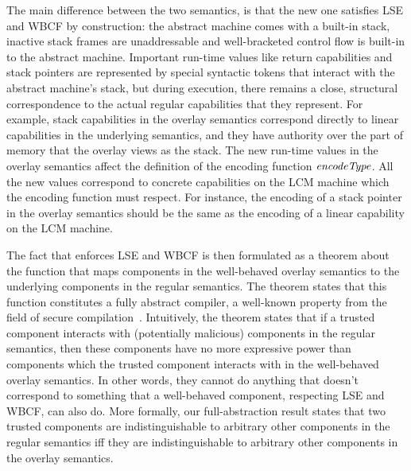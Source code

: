 \documentclass[acmsmall,screen]{acmart}\settopmatter{}
\newcommand{\trgcm}{\textsc{LCM}}
\newenvironment{jversion}%
    {\color{OliveGreen}}{}
\begin{document}
The main difference between the two semantics, is that the new one satisfies LSE and WBCF by construction: the abstract machine comes with a built-in stack, inactive stack frames are unaddressable and well-bracketed control flow is built-in to the abstract machine.
Important run-time values like return capabilities and stack pointers are represented by special syntactic tokens that interact with the abstract machine's stack, but during execution, there remains a close, structural correspondence to the actual regular capabilities that they represent.
For example, stack capabilities in the overlay semantics correspond directly to linear capabilities in the underlying semantics, and they have authority over the part of memory that the overlay views as the stack.
\begin{jversion}
The new run-time values in the overlay semantics affect the definition of the encoding function $\encType{}$.
All the new values correspond to concrete capabilities on the \trgcm{} machine which the encoding function must respect.
For instance, the encoding of a stack pointer in the overlay semantics should be the same as the encoding of a linear capability on the \trgcm{} machine.
\end{jversion}

The fact that \stktokens{} enforces LSE and WBCF is then formulated as a theorem about the function that maps components in the well-behaved overlay semantics to the underlying components in the regular semantics.
The theorem states that this function constitutes a fully abstract compiler, a well-known property from the field of secure compilation~\cite{abadi_protection_1999}.
Intuitively, the theorem states that if a trusted component interacts with (potentially malicious) components in the regular semantics, then these components have no more expressive power than components which the trusted component interacts with in the well-behaved overlay semantics.
In other words, they cannot do anything that doesn't correspond to something that a well-behaved component, respecting LSE and WBCF, can also do.
More formally, our full-abstraction result states that two trusted components are indistinguishable to arbitrary other components in the regular semantics iff they are indistinguishable to arbitrary other components in the overlay semantics.
\end{document}

